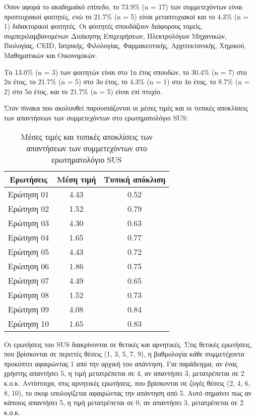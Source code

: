         Όσον αφορά το ακαδημαϊκό επίπεδο, το 73.9\% (n = 17) των συμμετεχόντων είναι προπτυχιακοί φοιτητές, ενώ το 21.7\% (n = 5) είναι μεταπτυχιακοί και το 4.3\% (n = 1) διδακτορικοί φοιτητές. Οι φοιτητές σπουδάζουν διάφορους τομείς, συμπεριλαμβανομένων Διοίκησης Επιχειρήσεων, Ηλεκτρολόγων Μηχανικών, Βιολογίας, CEID, Ιατρικής, Φιλολογίας, Φαρμακευτικής, Αρχιτεκτονικής, Χημικού, Μαθηματικών και Οικονομικών.

        Το 13.0\% (n = 3) των φοιτητών είναι στο 1ο έτος σπουδών, το 30.4\% (n = 7) στο 2ο έτος, το 21.7\% (n = 5) στο 3ο έτος, το 4.3\% (n = 1) στο 4ο έτος, το 8.7\% (n = 2) στο 5ο έτος, και το 21.7\% (n = 5) είναι επί πτυχίο.

        Στον πίνακα που ακολουθεί παρουσιάζονται οι μέσες τιμές και οι τυπικές αποκλίσεις των απαντήσεων των συμμετεχόντων στο ερωτηματολόγιο SUS:
        \begin{table}[H] \noindent\centering \small
            \caption{Μέσες τιμές και τυπικές αποκλίσεις των απαντήσεων των συμμετεχόντων στο ερωτηματολόγιο SUS}
            \begin{tabular}{c|c|c}
               \textbf{Ερωτήσεις} & \textbf{Μέση τιμή} & \textbf{Τυπική απόκλιση} \\
                \midrule
                Ερώτηση 01 & 4.43 & 0.52 \\
                Ερώτηση 02 & 1.52 & 0.79 \\
                Ερώτηση 03 & 4.30 & 0.63 \\
                Ερώτηση 04 & 1.65 & 0.77 \\
                Ερώτηση 05 & 4.43 & 0.72 \\
                Ερώτηση 06 & 1.86 & 0.75 \\
                Ερώτηση 07 & 4.49 & 0.65 \\
                Ερώτηση 08 & 1.52 & 0.73 \\
                Ερώτηση 09 & 4.08 & 0.84 \\
                Ερώτηση 10 & 1.65 & 0.83 \\
            \end{tabular}
            \label{tab:sus-results}
        \end{table}

        Οι ερωτήσεις του SUS διακρίνονται σε θετικές και αρνητικές. Στις θετικές ερωτήσεις, που βρίσκονται σε περιττές θέσεις (1, 3, 5, 7, 9), η βαθμολογία κάθε συμμετέχοντα προκύπτει αφαιρώντας 1 από την αρχική του απάντηση. Για παράδειγμα, αν ένας χρήστης απαντήσει 5, η τιμή μετατρέπεται σε 4, αν απαντήσει 3, μετατρέπεται σε 2 κ.ο.κ. Αντίστοιχα, στις αρνητικές ερωτήσεις, που βρίσκονται σε ζυγές θέσεις (2, 4, 6, 8, 10), το σκορ υπολογίζεται αφαιρώντας την απάντηση από 5. Αυτό σημαίνει πως αν κάποιος απαντήσει 5, η τιμή μετατρέπεται σε 0, αν απαντήσει 3, μετατρέπεται σε 2 κ.ο.κ.

